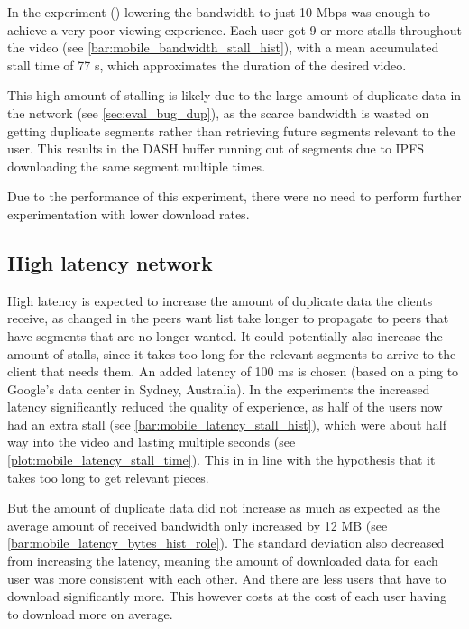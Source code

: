 In the experiment () lowering the bandwidth to just 10 \ac{Mbps} was enough to achieve a very poor viewing experience. Each user got 9 or more stalls throughout the video (see \autoref{bar:mobile_bandwidth_stall_hist}), with a mean accumulated stall time of 77 \ac{s}, which approximates the duration of the desired video.

This high amount of stalling is likely due to the large amount of duplicate data in the network (see \autoref{sec:eval_bug_dup}), as the scarce bandwidth is wasted on getting duplicate segments rather than retrieving future segments relevant to the user. This results in the \ac{DASH} buffer running out of segments due to \ac{IPFS} downloading the same segment multiple times.

Due to the performance of this experiment, there were no need to perform further experimentation with lower download rates.



\subsection{High latency network}
\label{sec:eval_high_latency}
High latency is expected to increase the amount of duplicate data the clients receive, as changed in the peers want list take longer to propagate to peers that have segments that are no longer wanted. It could potentially also increase the amount of stalls, since it takes too long for the relevant segments to arrive to the client that needs them. An added latency of 100 \ac{ms} is chosen (based on a ping to Google's data center in Sydney, Australia).
In the experiments the increased latency significantly reduced the quality of experience, as half of the users now had an extra stall (see \autoref{bar:mobile_latency_stall_hist}), which were about half way into the video and lasting multiple seconds (see \autoref{plot:mobile_latency_stall_time}). This in in line with the hypothesis that it takes too long to get relevant pieces.


But the amount of duplicate data did not increase as much as expected as the average amount of received bandwidth only increased by 12 \ac{MB} (see \autoref{bar:mobile_latency_bytes_hist_role}). The standard deviation also decreased from increasing the latency, meaning the amount of downloaded data for each user was more consistent with each other. And there are less users that have to download significantly more. This however costs at the cost of each user having to download more on average.

